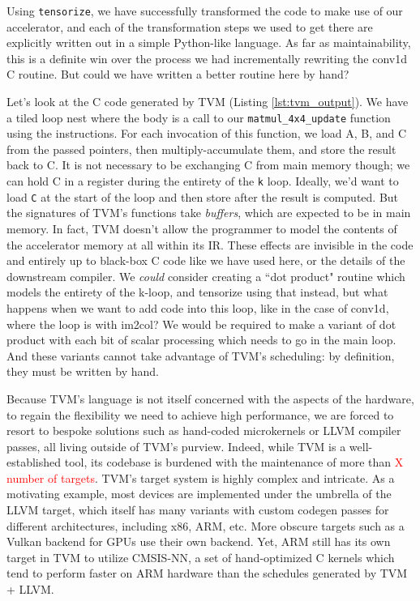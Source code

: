 \documentclass[acmsmall, nonacm=true]{acmart}
\begin{document}
Using \verb|tensorize|, we have successfully transformed the code to make use of our accelerator, and each of the transformation steps we used to get there are explicitly written out in a simple Python-like language. As far as maintainability, this is a definite win over the process we had incrementally rewriting the conv1d C routine. But could we have written a better routine here by hand? 

Let's look at the C code generated by TVM (Listing \ref{lst:tvm_output}). We have a tiled loop nest where the body is a call to our \verb|matmul_4x4_update| function using the instructions. For each invocation of this function, we load A, B, and C from the passed pointers, then multiply-accumulate them, and store the result back to C. It is not necessary to be exchanging C from main memory though; we can hold C in a register during the entirety of the \verb|k| loop. Ideally, we'd want to load \verb|C| at the start of the loop and then store after the result is computed. But the signatures of TVM's functions take \textit{buffers}, which are expected to be in main memory. In fact, TVM doesn't allow the programmer to model the contents of the accelerator memory at all within its IR. These effects are invisible in the code and entirely up to black-box C code like we have used here, or the details of the downstream compiler. We \textit{could} consider creating a ``dot product" routine which models the entirety of the k-loop, and tensorize using that instead, but what happens when we want to add code into this loop, like in the case of conv1d, where the loop is with im2col? We would be required to make a variant of dot product with each bit of scalar processing which needs to go in the main loop. And these variants cannot take advantage of TVM's scheduling: by definition, they must be written by hand.

Because TVM's language is not itself concerned with the aspects of the hardware, to regain the flexibility we need to achieve high performance, we are forced to resort to bespoke solutions such as hand-coded microkernels or LLVM compiler passes, all living outside of TVM's purview. Indeed, while TVM is a well-established tool, its codebase is burdened with the maintenance of more than \textcolor{red}{X number of targets}. TVM's target system is highly complex and intricate. 
As a motivating example, most devices are implemented under the umbrella of the LLVM target, which itself has many variants with custom codegen passes for different architectures, including x86, ARM, etc. More obscure targets such as a Vulkan backend for GPUs use their own backend. Yet, ARM still has its own target in TVM to utilize CMSIS-NN, a set of hand-optimized C kernels which tend to perform faster on ARM hardware than the schedules generated by TVM + LLVM. 
\end{document}
